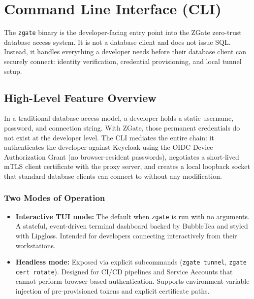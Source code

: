 \clearpage
\section{Command Line Interface (CLI)}

The \texttt{zgate} binary is the developer-facing entry point into the ZGate zero-trust database access system. It is not a database client and does not issue SQL. Instead, it handles everything a developer needs before their database client can securely connect: identity verification, credential provisioning, and local tunnel setup.

\subsection{High-Level Feature Overview}

In a traditional database access model, a developer holds a static username, password, and connection string. With ZGate, those permanent credentials do not exist at the developer level. The CLI mediates the entire chain: it authenticates the developer against Keycloak using the OIDC Device Authorization Grant (no browser-resident passwords), negotiates a short-lived mTLS client certificate with the proxy server, and creates a local loopback socket that standard database clients can connect to without any modification.

\subsubsection{Two Modes of Operation}
\begin{itemize}
    \item \textbf{Interactive TUI mode:} The default when \texttt{zgate} is run with no arguments. A stateful, event-driven terminal dashboard backed by BubbleTea and styled with Lipgloss. Intended for developers connecting interactively from their workstations.
    \item \textbf{Headless mode:} Exposed via explicit subcommands (\texttt{zgate tunnel}, \texttt{zgate cert rotate}). Designed for CI/CD pipelines and Service Accounts that cannot perform browser-based authentication. Supports environment-variable injection of pre-provisioned tokens and explicit certificate paths.
\end{itemize}


